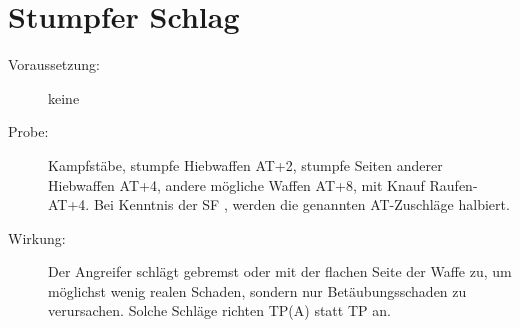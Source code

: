 \section{Stumpfer Schlag}
\label{bAT.stumpfer_schlag}
\begin{description}
    \item[Voraussetzung:]
        keine
    \item[Probe:]
        Kampfstäbe, stumpfe Hiebwaffen AT+2, stumpfe Seiten anderer Hiebwaffen AT+4, andere mögliche Waffen AT+8, mit Knauf Raufen-AT+4.
        Bei Kenntnis der SF , werden die genannten AT-Zuschläge halbiert.
    \item[Wirkung:]
        Der Angreifer schlägt gebremst oder mit der flachen Seite der Waffe zu, um möglichst wenig realen Schaden, sondern nur Betäubungsschaden zu verursachen.
        Solche Schläge richten TP(A) statt TP an.
\end{description}

